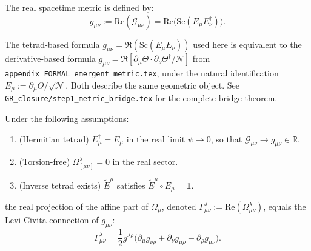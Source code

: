 The real spacetime metric is defined by:
\begin{equation}
g_{\mu\nu} := \mathrm{Re}(\mathcal{G}_{\mu\nu}) = \mathrm{Re}\bigl(\mathrm{Sc}(E_\mu E_\nu^\dagger)\bigr).
\end{equation}

\begin{remark}
\label{rem:bridge_R}
The tetrad-based formula $g_{\mu\nu} = \Re(\mathrm{Sc}(E_\mu E_\nu^\dagger))$ used here
is equivalent to the derivative-based formula
$g_{\mu\nu} = \Re[\partial_\mu\Theta\cdot\partial_\nu\Theta^\dagger/\mathcal{N}]$
from \texttt{appendix\_FORMAL\_emergent\_metric.tex}, under the natural identification
$E_\mu := \partial_\mu\Theta/\sqrt{\mathcal{N}}$.
Both describe the same geometric object.
See \texttt{GR\_closure/step1\_metric\_bridge.tex} for the complete bridge theorem.
\end{remark}

\begin{lemma}
\label{lem:re_omega_levi_civita}
Under the following assumptions:
\begin{enumerate}
  \item[(A1)] (Hermitian tetrad) $E_\mu^\dagger = E_\mu$ in the real limit $\psi \to 0$, so that $\mathcal{G}_{\mu\nu} \to g_{\mu\nu} \in \mathbb{R}$.
  \item[(A2)] (Torsion-free) $\Omega_{[\mu\nu]}^\lambda = 0$ in the real sector.
  \item[(A3)] (Inverse tetrad exists) $\tilde{E}^\mu$ satisfies $\tilde{E}^\mu \circ E_\mu = \mathbf{1}$.
\end{enumerate}
the real projection of the affine part of $\Omega_\mu$, denoted
$\Gamma^\lambda_{\mu\nu} := \mathrm{Re}(\Omega^\lambda_{\mu\nu})$,
equals the Levi-Civita connection of $g_{\mu\nu}$:
\begin{equation}
\Gamma^\lambda_{\mu\nu} = \frac{1}{2} g^{\lambda\rho}\bigl(\partial_\mu g_{\nu\rho} + \partial_\nu g_{\mu\rho} - \partial_\rho g_{\mu\nu}\bigr).
\end{equation}
\end{lemma}

